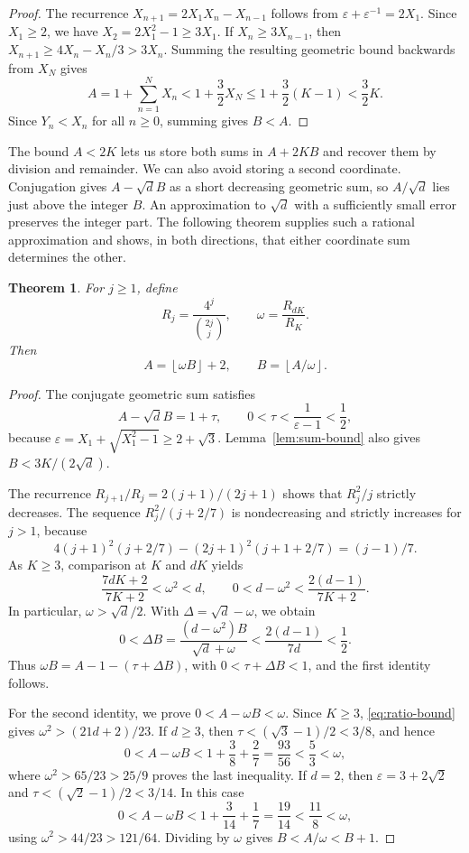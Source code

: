 \documentclass[11pt]{article}
\newtheorem{theorem}{Theorem}
\theoremstyle{remark}
\newcommand{\eps}{\varepsilon}
\newcommand{\fl}[1]{\left\lfloor #1\right\rfloor}
\begin{document}
\begin{proof}
The recurrence $X_{n+1}=2X_1X_n-X_{n-1}$ follows from
$\eps+\eps^{-1}=2X_1$.
Since $X_1\ge2$, we have $X_2=2X_1^2-1\ge3X_1$.
If $X_n\ge3X_{n-1}$, then
$X_{n+1}\ge4X_n-X_n/3>3X_n$.
Summing the resulting geometric bound backwards from $X_N$ gives
\[
  A=1+\sum_{n=1}^N X_n
   <1+\frac32X_N
   \le1+\frac32(K-1)<\frac32K.
\]
Since $Y_n<X_n$ for all $n\ge0$, summing gives $B<A$.
\end{proof}

The bound $A<2K$ lets us store both sums in $A+2KB$ and recover them by
division and remainder. We can also avoid storing a second coordinate.
Conjugation gives $A-\sqrt d B$ as a short decreasing geometric sum,
so $A/\sqrt d$ lies just above the integer $B$. An approximation to
$\sqrt d$ with a sufficiently small error preserves the integer part.
The following theorem supplies such a rational approximation and shows,
in both directions, that either coordinate sum determines the other.

\begin{theorem}\label{thm:coordinate}
For $j\ge1$, define
\[
  R_j=\frac{4^j}{\binom{2j}{j}},\qquad \omega=\frac{R_{dK}}{R_K}.
\]
Then
\begin{equation}\label{eq:coordinate}
  A=\fl{\omega B}+2,\qquad B=\fl{A/\omega}.
\end{equation}
\end{theorem}

\begin{proof}
The conjugate geometric sum satisfies
\[
  A-\sqrt d B=1+\tau,\qquad
  0<\tau<\frac1{\eps-1}<\frac12,
\]
because $\eps=X_1+\sqrt{X_1^2-1}\ge2+\sqrt3$.
Lemma~\ref{lem:sum-bound} also gives $B<3K/(2\sqrt d)$.

The recurrence $R_{j+1}/R_j=2(j+1)/(2j+1)$ shows that
$R_j^2/j$ strictly decreases. The sequence $R_j^2/(j+2/7)$
is nondecreasing and strictly increases for $j>1$, because
\[
  4(j+1)^2(j+2/7)-(2j+1)^2(j+1+2/7)=(j-1)/7.
\]
As $K\ge3$, comparison at $K$ and $dK$ yields
\begin{equation}\label{eq:ratio-bound}
  \frac{7dK+2}{7K+2}<\omega^2<d,\qquad
  0<d-\omega^2<\frac{2(d-1)}{7K+2}.
\end{equation}
In particular, $\omega>\sqrt d/2$. With $\Delta=\sqrt d-\omega$, we obtain
\[
  0<\Delta B=\frac{(d-\omega^2)B}{\sqrt d+\omega}
  <\frac{2(d-1)}{7d}<\frac12.
\]
Thus $\omega B=A-1-(\tau+\Delta B)$, with $0<\tau+\Delta B<1$,
and the first identity follows.

For the second identity, we prove $0<A-\omega B<\omega$.
Since $K\ge3$, \eqref{eq:ratio-bound} gives $\omega^2>(21d+2)/23$.
If $d\ge3$, then $\tau<(\sqrt3-1)/2<3/8$, and hence
\[
  0<A-\omega B<1+\frac38+\frac27=\frac{93}{56}<\frac53<\omega,
\]
where $\omega^2>65/23>25/9$ proves the last inequality.
If $d=2$, then $\eps=3+2\sqrt2$ and
$\tau<(\sqrt2-1)/2<3/14$. In this case
\[
  0<A-\omega B<1+\frac3{14}+\frac17=\frac{19}{14}<\frac{11}{8}<\omega,
\]
using $\omega^2>44/23>121/64$.
Dividing by $\omega$ gives $B<A/\omega<B+1$.
\end{proof}
\end{document}
